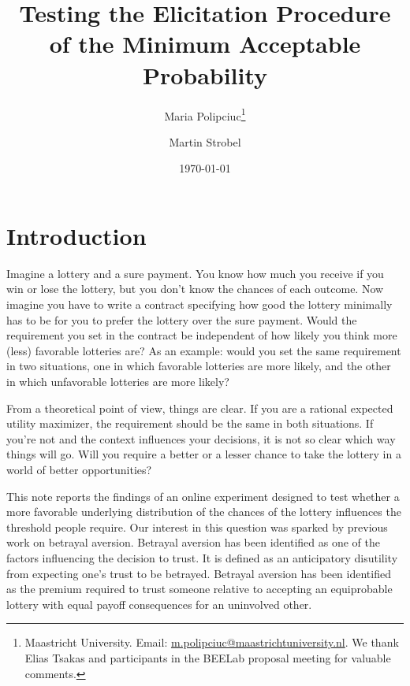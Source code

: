 
\title{Testing the Elicitation Procedure \\ of the Minimum Acceptable Probability}
\author{Maria Polipciuc\thanks{Maastricht University. Email: \url{m.polipciuc@maastrichtuniversity.nl}. We thank Elias Tsakas and participants in the BEELab proposal meeting for valuable comments.} \and Martin Strobel\footnotemark[1]}
\date{\today	\vspace{1cm}}
\titlepage



\begin{titlepage}
\clearpage
\maketitle
\thispagestyle{empty}


\begin{abstract}

\end{abstract}
\end{titlepage}


\section{Introduction}\label{sec:intro}
Imagine a lottery and a sure payment.
You know how much you receive if you win or lose the lottery, but you don't know the chances of each outcome.
Now imagine you have to write a contract specifying how good the lottery minimally has to be for you to prefer the lottery over the sure payment.
Would the requirement you set in the contract be independent of how likely you think more (less) favorable lotteries are?
As an example: would you set the same requirement in two situations, one in which favorable lotteries are more likely, and the other in which unfavorable lotteries are more likely?

From a theoretical point of view, things are clear.
If you are a rational expected utility maximizer, the requirement should be the same in both situations.
If you're not and the context influences your decisions, it is not so clear which way things will go.
Will you require a better or a lesser chance to take the lottery in a world of better opportunities?

This note reports the findings of an online experiment designed to test whether a more favorable underlying distribution of the chances of the lottery influences the threshold people require.
Our interest in this question was sparked by previous work on betrayal aversion.
Betrayal aversion has been identified as one of the factors influencing the decision to trust.
It is defined as an anticipatory disutility from expecting one's trust to be betrayed.
Betrayal aversion has been identified as the premium required to trust someone relative to accepting an equiprobable lottery with equal payoff consequences for an uninvolved other.

